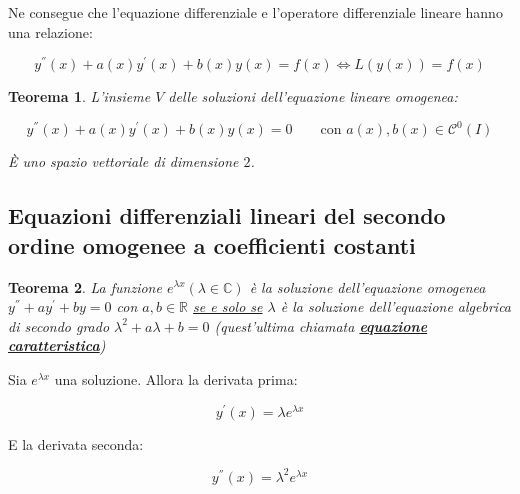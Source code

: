 \documentclass[a4paper]{article}
\newtheorem{theorem}{Teorema}
\begin{document}
	\noindent
	Ne consegue che l'equazione differenziale e l'operatore differenziale lineare hanno una relazione:
	
	\begin{equation*}
		y^{''}\left(x\right) + a\left(x\right)y^{'}\left(x\right) + b\left(x\right)y\left(x\right) = f\left(x\right) \iff L\left(y\left(x\right)\right) = f\left(x\right)
	\end{equation*}

	\noindent
	\begin{theorem}
		L'insieme $V$ delle soluzioni dell'equazione lineare omogenea:
		
		\begin{equation*}
			y^{''}\left(x\right) + a\left(x\right)y^{'}\left(x\right) + b\left(x\right)y\left(x\right) = 0 \hspace{2em} \text{con } a\left(x\right), b\left(x\right) \in \mathcal{C}^{0}\left(I\right)
		\end{equation*}
	
		\noindent
		È uno spazio vettoriale di dimensione $2$.
	\end{theorem}

	\subsection{Equazioni differenziali lineari del secondo ordine omogenee a coefficienti costanti}
	
	\begin{theorem}
		La funzione $e^{\lambda x} \left(\lambda\in\mathbb{C}\right)$ è la soluzione dell'equazione omogenea $y^{''} + ay^{'} + by = 0$ con $a, b \in \mathbb{R}$ \underline{se e solo se} $\lambda$ è la soluzione dell'equazione algebrica di secondo grado $\lambda^{2} + a\lambda + b = 0$ (quest'ultima chiamata \textcolor{Red3}{\textbf{\underline{equazione caratteristica}}})
	\end{theorem}

	\noindent
	Sia $e^{\lambda x}$ una soluzione. Allora la derivata prima:
	
	\begin{equation*}
		y^{'}\left(x\right) = \lambda e^{\lambda x}
	\end{equation*}

	\noindent
	E la derivata seconda:
	
	\begin{equation*}
		y^{''}\left(x\right) = \lambda^{2} e^{\lambda x}
	\end{equation*}
	
\end{document}
